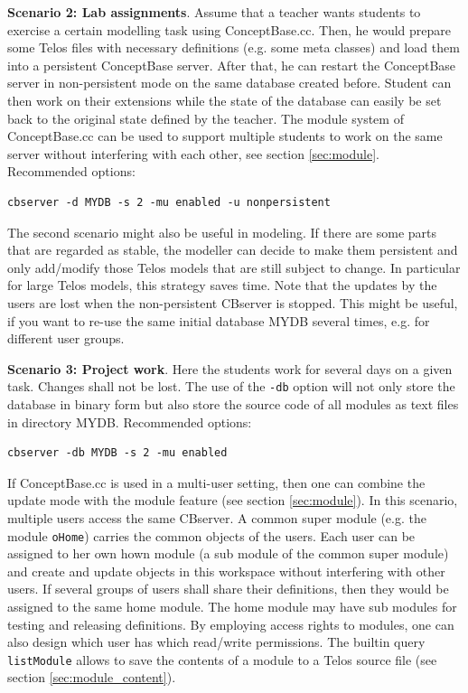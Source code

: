 {\bf Scenario 2: Lab assignments}.
Assume that a teacher wants students to exercise a certain modelling task
using ConceptBase.cc. Then, he would prepare some Telos files with necessary
definitions (e.g. some meta classes) and load them into a persistent
ConceptBase server. After that, he can restart the ConceptBase server
in non-persistent mode on the same database created before. Student
can then work on their extensions while the state of the database
can easily be set back to the original state defined by the teacher.
The module system of ConceptBase.cc can be used to support multiple
students to work on the same server without interfering with each other,
see section \ref{sec:module}.
Recommended options:
\begin{verbatim}
cbserver -d MYDB -s 2 -mu enabled -u nonpersistent
\end{verbatim}

The second scenario might also be useful in modeling. If there are some
parts that are regarded as stable, the modeller can decide to make
them persistent and only add/modify those Telos models that are still
subject to change. In particular for large Telos models, this strategy
saves time.
Note that the updates by the users are lost when the non-persistent
CBserver is stopped. This might be useful, if you want to re-use the same
initial database MYDB several times, e.g. for different user groups.
\newline

{\bf Scenario 3: Project work}.
Here the students work for several days on a given task. Changes shall 
not be lost. The use of the {\tt -db} option will not only store the database
in binary form but also store the source code of all modules as text
files in directory MYDB.
Recommended options:
\begin{verbatim}
cbserver -db MYDB -s 2 -mu enabled 
\end{verbatim}


If ConceptBase.cc is used in a multi-user setting, then one can combine
the update mode with the module feature (see section \ref{sec:module}).
In this scenario, multiple users access the same CBserver.
A common super module (e.g. the module {\tt oHome}) carries the common
objects of the users. Each user can be assigned to her own hown module
(a sub module of the common super module) and create and update 
objects in this workspace without interfering with other users.
If several groups of users shall share their definitions, then they would
be assigned to the same home module. The home module may have sub modules
for testing and releasing definitions. By employing access rights to
modules, one can also design which user has which read/write permissions.
The builtin query {\tt listModule} allows to save the contents of a
module to a Telos source file (see section \ref{sec:module_content}).






